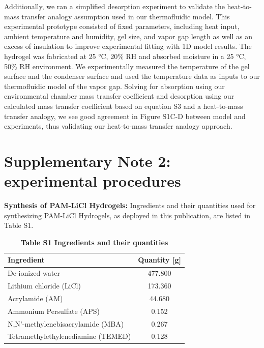 \documentclass[11pt]{article}
\begin{document}
Additionally, we ran a simplified desorption experiment to validate the heat-to-mass transfer analogy assumption used in our thermofluidic model. This experimental prototype consisted of fixed parameters, including heat input, ambient temperature and humidity, gel size, and vapor gap length as well as an excess of insulation to improve experimental fitting with 1D model results. The hydrogel was fabricated at 25 °C, 20\% RH and absorbed moisture in a 25 °C, 50\% RH environment. We experimentally measured the temperature of the gel surface and the condenser surface and used the temperature data as inputs to our thermofluidic model of the vapor gap. Solving for absorption using our environmental chamber mass transfer coefficient and desorption using our calculated mass transfer coefficient based on equation S3 and a heat-to-mass transfer analogy, we see good agreement in Figure S1C-D between model and experiments, thus validating our heat-to-mass transfer analogy approach.

\section{Supplementary Note 2: experimental procedures}

\textbf{Synthesis of PAM-LiCl Hydrogels:} Ingredients and their quantities used for synthesizing PAM-LiCl Hydrogels, as deployed in this publication, are listed in Table S1.

\begin{table}[!ht]
\centering
\caption*{\textbf{Table S1 Ingredients and their quantities}}
\begin{tabular}{lc}
\toprule
\textbf{Ingredient} & \textbf{Quantity [g]}\\
\midrule
De-ionized water & 477.800\\
Lithium chloride (LiCl) & 173.360\\
Acrylamide (AM) & 44.680\\
Ammonium Persulfate (APS) & 0.152\\
N,N'-methylenebisacrylamide (MBA) & 0.267\\
Tetramethylethylenediamine (TEMED) & 0.128\\
\bottomrule
\end{tabular}
\end{table}
\end{document}
